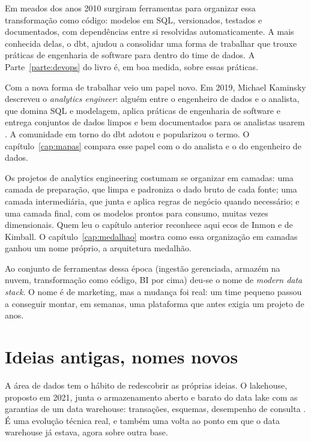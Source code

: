 Em meados dos anos 2010 surgiram ferramentas para organizar essa transformação como
código: modelos em SQL, versionados, testados e documentados, com dependências entre si
resolvidas automaticamente. A mais conhecida delas, o dbt, ajudou a consolidar uma forma
de trabalhar que trouxe práticas de engenharia de software para dentro do time de dados.
A Parte~\ref{parte:devops} do livro é, em boa medida, sobre essas práticas.

Com a nova forma de trabalhar veio um papel novo. Em 2019, Michael Kaminsky descreveu o
\emph{analytics engineer}: alguém entre o engenheiro de dados e o analista, que domina SQL
e modelagem, aplica práticas de engenharia de software e entrega conjuntos de dados
limpos e bem documentados para os analistas usarem \parencite{kaminsky2019}. A
comunidade em torno do dbt adotou e popularizou o termo. O
capítulo~\ref{cap:mapas} compara esse papel com o do analista e o do engenheiro de
dados.

Os projetos de analytics engineering costumam se organizar em camadas: uma camada de
preparação, que limpa e padroniza o dado bruto de cada fonte; uma camada intermediária,
que junta e aplica regras de negócio quando necessário; e uma camada final, com os
modelos prontos para consumo, muitas vezes dimensionais. Quem leu o capítulo anterior
reconhece aqui ecos de Inmon e de Kimball. O capítulo~\ref{cap:medalhao} mostra como
essa organização em camadas ganhou um nome próprio, a arquitetura medalhão.

Ao conjunto de ferramentas dessa época (ingestão gerenciada, armazém na nuvem,
transformação como código, BI por cima) deu-se o nome de \emph{modern data stack}. O
nome é de marketing, mas a mudança foi real: um time pequeno passou a conseguir montar,
em semanas, uma plataforma que antes exigia um projeto de anos.


\section{Ideias antigas, nomes novos}
\label{sec:nomes-novos}

A área de dados tem o hábito de redescobrir as próprias ideias. O lakehouse, proposto em
2021, junta o armazenamento aberto e barato do data lake com as garantias de um data
warehouse: transações, esquemas, desempenho de consulta \parencite{armbrust2021}. É uma
evolução técnica real, e também uma volta ao ponto em que o data warehouse já estava,
agora sobre outra base.

